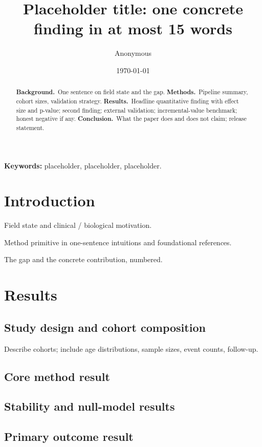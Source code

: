 \documentclass[11pt,a4paper]{article}
\title{\fontsize{15}{18}\bfseries\sffamily
Placeholder title: one concrete finding in at most 15 words}
\author[1,*]{Anonymous}
\affil[1]{Placeholder affiliation.}
\affil[*]{Correspondence: \texttt{author@example.org}.}
\date{\today}
\begin{document}
\maketitle
\thispagestyle{empty}
\vspace{-2em}

\begin{abstract}
\noindent
\textbf{Background.}\, One sentence on field state and the gap.
\textbf{Methods.}\, Pipeline summary, cohort sizes, validation strategy.
\textbf{Results.}\, Headline quantitative finding with effect size and p-value; second finding; external validation; incremental-value benchmark; honest negative if any.
\textbf{Conclusion.}\, What the paper does and does not claim; release statement.
\end{abstract}

\medskip
\noindent\textbf{Keywords:} placeholder, placeholder, placeholder.

\section{Introduction}\label{sec:intro}
Field state and clinical / biological motivation\citep{placeholderCiteA}.

Method primitive in one-sentence intuitions and foundational references\citep{placeholderCiteB}.

The gap and the concrete contribution, numbered.

\section{Results}\label{sec:results}

\subsection{Study design and cohort composition}
Describe cohorts; include age distributions, sample sizes, event counts, follow-up.

\subsection{Core method result}
\subsection{Stability and null-model results}
\subsection{Primary outcome result}
\end{document}
